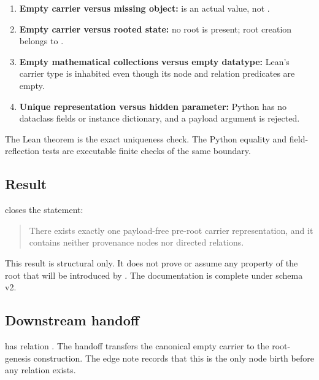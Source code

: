 \begin{enumerate}
\def\labelenumi{\arabic{enumi}.}
\tightlist
\item
  \textbf{Empty carrier versus missing object:} \texttt{\protect{}}
  is an actual value, not \texttt{\protect{}}.
\item
  \textbf{Empty carrier versus rooted state:} no root is present; root
  creation belongs to \texttt{\protect{}}.
\item
  \textbf{Empty mathematical collections versus empty datatype:} Lean's
  carrier type is inhabited even though its node and relation predicates
  are empty.
\item
  \textbf{Unique representation versus hidden parameter:} Python has no
  dataclass fields or instance dictionary, and a payload argument is
  rejected.
\end{enumerate}

The Lean theorem \texttt{\protect{}} is the exact uniqueness check. The
Python equality and field-reflection tests are executable finite checks
of the same boundary.

\subsection{Result}\label{result-2}

\texttt{\protect{}} closes the statement:

\begin{quote}
There exists exactly one payload-free pre-root carrier representation,
and it contains neither provenance nodes nor directed relations.
\end{quote}

This result is structural only. It does not prove or assume any property
of the root that will be introduced by \texttt{\protect{}}. The documentation
is complete under schema v2.

\subsection{Downstream handoff}\label{downstream-handoff-2}

\texttt{\protect{}} has relation \texttt{\protect{}}. The
handoff transfers the canonical empty carrier to the root-genesis
construction. The edge note records that this is the only node birth
before any relation exists.

